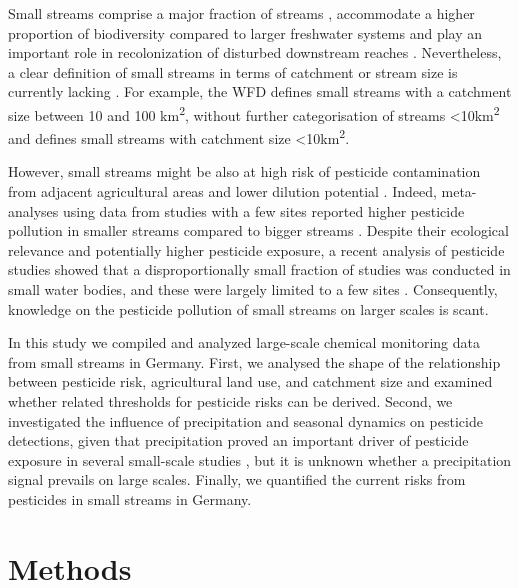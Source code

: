 \documentclass[journal=esthag,manuscript=article]{achemso}
\begin{document}
Small streams comprise a major fraction of streams \citep{nadeau_hydrological_2007}, accommodate a higher proportion of biodiversity compared to larger freshwater systems \citep{davies_comparison_2008, biggs_report_2014} and play an important role in recolonization of disturbed downstream reaches \citep{liess_analyzing_2005, orlinskiy_forested_2015}.
Nevertheless, a clear definition of small streams in terms of catchment or stream size is currently lacking \citep{lorenz_specifics_2016}. 
For example, the WFD defines small streams with a catchment size between 10 and 100 km\textsuperscript{2}, without further categorisation of streams \textless 10km\textsuperscript{2} and \citet{lorenz_specifics_2016} defines small streams with catchment size \textless 10km\textsuperscript{2}. 

However, small streams might be also at high risk of pesticide contamination from adjacent agricultural areas and lower dilution potential \citep{schulz_field_2004,liess_determination_1999}.
Indeed, meta-analyses using data from studies with a few sites reported higher pesticide pollution in smaller streams compared to bigger streams \citep{stehle_pesticide_2015,schulz_field_2004}.
Despite their ecological relevance and potentially higher pesticide exposure, a recent analysis of pesticide studies showed that a disproportionally small fraction of studies was conducted in small water bodies, and these were largely limited to a few sites \citep{lorenz_specifics_2016}. 
Consequently, knowledge on the pesticide pollution of small streams on larger scales is scant.

In this study we compiled and analyzed large-scale chemical monitoring data from small streams in Germany. 
First, we analysed the shape of the relationship between pesticide risk, agricultural land use, and catchment size and examined whether related thresholds for pesticide risks can be derived. 
Second, we investigated the influence of precipitation and seasonal dynamics on pesticide detections, given that precipitation proved an important driver of pesticide exposure in several small-scale studies \citep{wittmer_significance_2010}\citep{schulz_field_2004}, but it is unknown whether a precipitation signal prevails on large scales. 
Finally, we quantified the current risks from pesticides in small streams in Germany.



\section{Methods}
\end{document}
